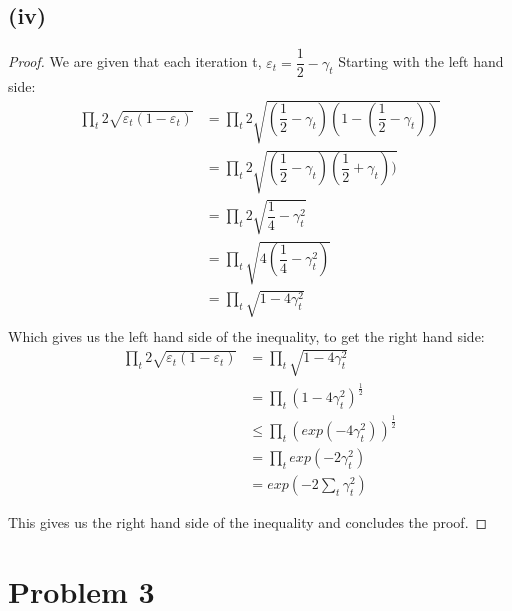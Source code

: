 \documentclass[]{homework}
\begin{document}
\subsection*{(iv)}
\begin{proof}
We are given that each iteration t, $\varepsilon_t = \dfrac{1}{2}-\gamma_t $
Starting with the left hand side: 
\begin{align*}
    \prod_t  2\sqrt{\varepsilon_t (1-\varepsilon_t)}  
    &=  \prod_t 2\sqrt{(\dfrac{1}{2}- \gamma_t)(1-(\dfrac{1}{2}- \gamma_t))} \\
    &=  \prod_t 2\sqrt{(\dfrac{1}{2}- \gamma_t)(\dfrac{1}{2}+ \gamma_t))} \\
    &=  \prod_t 2\sqrt{\dfrac{1}{4}- \gamma_t^2} \\
    &=  \prod_t \sqrt{4(\dfrac{1}{4}- \gamma_t^2)} \\
    &=  \prod_t \sqrt{1- 4\gamma_t^2} \\
\end{align*}
Which gives us the left hand side of the inequality, to get the right hand side:
\begin{align*}
    \prod_t  2\sqrt{\varepsilon_t (1-\varepsilon_t)} &=  \prod_t \sqrt{1- 4\gamma_t^2} \\
    &=  \prod_t (1- 4\gamma_t^2)^{\frac{1}{2}} \\
    &\leq \prod_t  (exp(-4\gamma_t^2))^{\frac{1}{2}}\\
    &= \prod_t  exp(-2\gamma_t^2)\\
    &= exp(-2 \sum_t\gamma_t^2)
\end{align*}

This gives us the right hand side of the inequality and concludes the proof.
\end{proof}
\section*{Problem 3}
\color{black}
\end{document}
